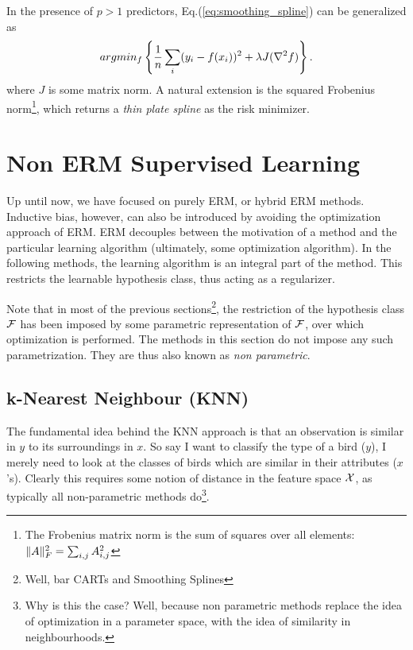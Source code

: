 In the presence of $p>1$ predictors, Eq.(\ref{eq:smoothing_spline}) can be generalized as 
\begin{align}
\label{eq:smoothing_spline_multi}
	 argmin_{f}\left\{ \frac{1}{n}\sum_i (y_i-f(x_i))^2 + \lambda J(\nabla^2 f)   \right\}.
\end{align}
where $J$ is some matrix norm. A natural extension is the squared Frobenius norm\footnote{The Frobenius matrix norm is the sum of squares over all elements: $\Vert A \Vert^2_F=\sum_{i,j} A_{i,j}^2$ }, which returns a \emph{thin plate spline} as the risk minimizer.




\section{Non ERM Supervised Learning}
\label{sec:non_erm}
Up until now, we have focused on purely ERM, or hybrid ERM methods.
Inductive bias, however, can also be introduced by avoiding the optimization approach of ERM.
ERM decouples between the motivation of a method and the particular learning algorithm (ultimately, some optimization algorithm).
In the following methods, the learning algorithm is an integral part of the method. 
This restricts the learnable hypothesis class, thus acting as a regularizer.

Note that in most of the previous sections\footnote{Well, bar CARTs and Smoothing Splines}, the restriction of the hypothesis class $\mathcal{F}$ has been imposed by some parametric representation of $\mathcal{F}$, over which optimization is performed.
The methods in this section do not impose any such parametrization. They are thus also known as \emph{non parametric}.

 

\subsection{k-Nearest Neighbour (KNN)}
\label{sec:knn}
The fundamental idea behind the KNN approach is that an observation is similar in $y$ to its surroundings in $x$. 
So say I want to classify the type of a bird ($y$), I merely need to look at the classes of birds which are similar in their attributes ($x$'s). 
Clearly this requires some notion of distance in the feature space $\mathcal{X}$, as typically all non-parametric methods do\footnote{Why is this the case? Well, because non parametric methods replace the idea of optimization in a parameter space, with the idea of similarity in neighbourhoods.}.


